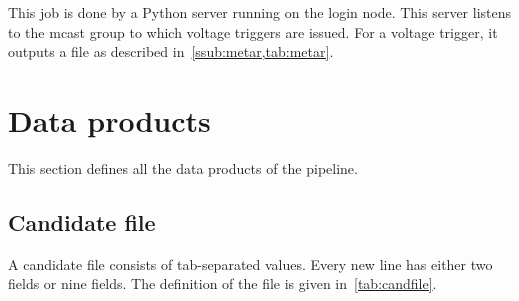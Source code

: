 \par This job is done by a Python server running on the login node. 
This server listens to the mcast group to which voltage triggers are issued.
For a voltage trigger, it outputs a  file as described in~\autoref{ssub:metar,tab:metar}.

\section {Data products}
\par This section defines all the data products of the pipeline. 
\subsection {Candidate file}
\label{ssub:candfile}
\par A candidate file consists of tab-separated values. Every new line has either two fields or nine fields. 
The definition of the file is given in~\autoref{tab:candfile}.
